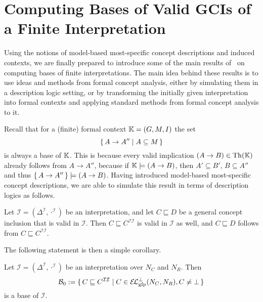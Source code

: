 \section{Computing Bases of Valid GCIs of a Finite Interpretation}
\label{sec:base-all-valid}

Using the notions of model-based most-specific concept descriptions and induced contexts,
we are finally prepared to introduce some of the main results of~\cite{Diss-Felix} on
computing bases of finite interpretations.  The main idea behind these results is to use
ideas and methods from formal concept analysis, either by simulating them in a description
logic setting, or by transforming the initially given interpretation into formal contexts
and applying standard methods from formal concept analysis to it.

Recall that for a (finite) formal context ${\mathbb{K}} = (G, M, I)$ the set
\begin{equation*}
  {\ensuremath{\{\, A \to A'' \mid A \subseteq M \,\}}}
\end{equation*}
is always a base of ${\mathbb{K}}$.  This is because every valid implication $(A \to B) \in
\operatorname{Th}({\mathbb{K}})$ already follows from $A \to A''$, because if ${\mathbb{K}} \models (A \to B)$, then
$A' \subseteq B'$, \ie $B \subseteq A''$ and thus ${\{\, A \to A ''\,\}} \models (A \to B)$.
Having introduced model-based most-specific concept descriptions, we are able to simulate
this result in terms of description logics as follows.

\begin{Lemma}
  \label{lem:simple-entailment-with-mmsc}
  Let $\mathcal{I} = (\Delta^{\mathcal{I}}, \cdot^{\mathcal{I}})$ be an interpretation,
  and let $C \sqsubseteq D$ be a general concept inclusion that is valid in $\mathcal{I}$.
  Then $C \sqsubseteq C^{\mathcal{I}\mathcal{I}}$ is valid in $\mathcal{I}$ as well, and
  $C \sqsubseteq D$ follows from $C \sqsubseteq C^{\mathcal{I}\mathcal{I}}$.
\end{Lemma}

The following statement is then a simple corollary.

\begin{Corollary}
  \label{cor:Felix-base-B0}
  Let $\mathcal{I} = (\Delta^{\mathcal{I}}, \cdot^{\mathcal{I}})$ be an interpretation
  over $N_C$ and $N_R$.  Then
  \begin{equation}
    \label{eq:20}
    \mathcal{B}_0 := \set{ C \sqsubseteq C^{\mathcal{I}\mathcal{I}} \mid C \in
      \ELgfpbot(N_C, N_R), C \neq \bot }
  \end{equation}
  is a base of $\mathcal{I}$.
\end{Corollary}

